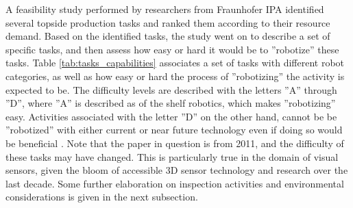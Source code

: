 A feasibility study performed by researchers from \ac{Fraunhofer IPA}\cite{6094661} identified several topside production tasks and ranked them according to their resource demand. 
Based on the identified tasks, the study went on to describe a set of specific tasks, and then assess how easy or hard it would be to ''robotize'' these tasks. Table \ref{tab:tasks_capabilities} associates a set of tasks with different robot categories, as well as how easy or hard the process of ''robotizing'' the activity is expected to be. The difficulty levels are described with the letters ''A'' through ''D'', where  ''A'' is described as of the shelf robotics, which makes ''robotizing'' easy. Activities associated with the letter ''D'' on the other hand, cannot be be ''robotized'' with either current or near future technology even if doing so would be beneficial \cite{6094661}. Note that the paper in question is from 2011, and the difficulty of these tasks may have changed. This is particularly true in the domain of visual sensors, given the bloom of accessible 3D sensor technology and research over the last decade. Some further elaboration on inspection activities and environmental considerations is given in the next subsection. 


